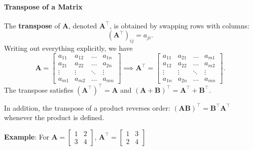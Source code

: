 \paragraph*{Transpose of a Matrix}
The \textbf{transpose} of $ \mathbf{A} $, denoted $ \mathbf{A}^\top $, is obtained by swapping rows with columns:
\begin{equation*}
  (\mathbf{A}^\top)_{ij} = a_{ji}.
\end{equation*}
Writing out everything explicitly, we have
\begin{equation*}
  \mathbf{A} = \begin{bmatrix} 
    a_{11} & a_{12} & \ldots & a_{1n} \\ 
    a_{21} & a_{22} & \ldots & a_{2n} \\ 
    \vdots & \vdots & \ddots & \vdots \\ 
    a_{m1} & a_{m2} & \ldots & a_{mn}
  \end{bmatrix} \implies
  \mathbf{A}^\top = \begin{bmatrix} 
    a_{11} & a_{21} & \ldots & a_{m1} \\ 
    a_{12} & a_{22} & \ldots & a_{m2} \\ 
    \vdots & \vdots & \ddots & \vdots \\ 
    a_{1n} & a_{2n} & \ldots & a_{mn} 
  \end{bmatrix}.
\end{equation*}
The transpose satisfies $ (\mathbf{A}^\top)^\top = \mathbf{A} $ and $ (\mathbf{A} + \mathbf{B})^\top = \mathbf{A}^\top + \mathbf{B}^\top $.

In addition, the transpose of a product reverses order: $(\mathbf{A}\mathbf{B})^\top = \mathbf{B}^\top \mathbf{A}^\top$ whenever the product is defined.

\begin{exampleBox}
    \textbf{Example}: For $ \mathbf{A} = \begin{bmatrix}1 & 2\\3 & 4\end{bmatrix} $, $ \mathbf{A}^\top = \begin{bmatrix}1 & 3\\2 & 4\end{bmatrix} $
\end{exampleBox}

